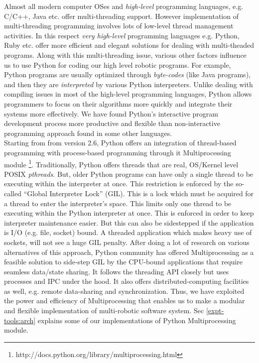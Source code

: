 Almost all modern computer OSes and {\em high-level} programming languages, e.g. C/C++, Java etc. offer multi-threading support. However implementation of multi-threading programming involves lots of low-level thread management activities. In this respect {\em very high-level} programming languages e.g. Python, Ruby etc. offer more efficient and elegant solutions for dealing with multi-theaded programs. Along with this multi-threading issue, various other factors influence us to use Python for coding our high level robotic programs. For example, Python programs are  usually optimized through {\em byte-codes} (like Java programs), and then they are {\em interpreted} by various Python interpreters. Unlike dealing with compiling issues in most of the high-level programming languages, Python allows programmers to focus on their  algorithms more quickly and integrate their systems more effectively.  We have found Python's interactive program development process more productive and flexible than non-interactive programming approach found in some other languages.\\ 
Starting from from version 2.6, Python offers an integration of thread-based programming with process-based programming through it Multiprocessing module \footnote{http://docs.python.org/library/multiprocessing.html}. Traditionally, Python offers threads that are real, OS/Kernel level POSIX {\em pthreads}.  But, older Python programs can have only a single thread to be executing within
 the interpreter at once. This restriction is enforced by the
  so-called ``Global Interpreter Lock'' (GIL). This is a lock which must be
 acquired for a thread to enter the interpreter’s space.
 This limits only one thread to  be executing within the Python
 interpreter at once.  This is enforced  in order to keep interpreter maintenance easier.
 But this can also be sidestepped if the application is I/O (e.g. file, socket) bound. A threaded application which makes heavy use of sockets, will not see a huge GIL penalty.  After  doing a lot of research on various alternatives of this approach, Python community has offered Multiprocessing as a feasible solution to side-step GIL by the CPU-bound applications that  require seamless data/state sharing.   It follows the threading API closely but uses processes and
 IPC under the hood. It also offers distributed-computing facilities as well, e.g. remote data-sharing and synchronization.  Thus, we have exploited the power and efficiency of Multiprocessing that enables us to make a modular and flexible implementation of multi-robotic software system. Sec \ref{expt-tools:arch} explains some of our implementations of Python Multiprocessing module.\\
